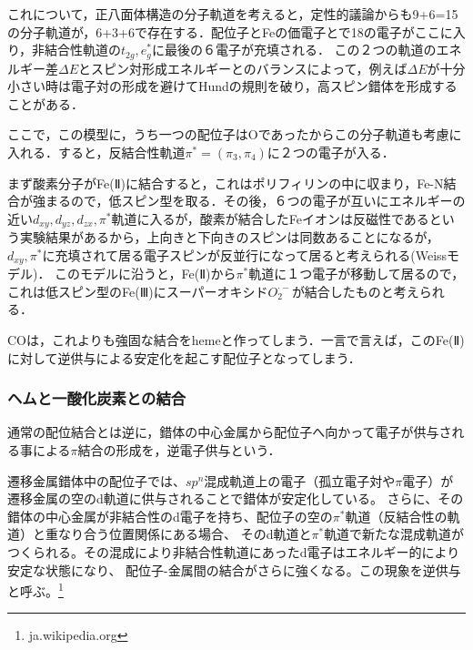 \documentclass[uplatex, dvipdfmx]{jsreport}
\begin{document}
\begin{model}[正八面体構造の分子軌道]
    これについて，正八面体構造の分子軌道を考えると，定性的議論からも9+6=15の分子軌道が，6+3+6で存在する．配位子とFeの価電子とで18の電子がここに入り，非結合性軌道の$t_{2g},e^*_g$に最後の６電子が充填される．
    この２つの軌道のエネルギー差$\Delta E$とスピン対形成エネルギーとのバランスによって，例えば$\Delta E$が十分小さい時は電子対の形成を避けてHundの規則を破り，高スピン錯体を形成することがある．

    ここで，この模型に，うち一つの配位子はOであったからこの分子軌道も考慮に入れる．すると，反結合性軌道$\pi^*=(\pi_3,\pi_4)$に２つの電子が入る．
\end{model}
\begin{explanation}[酸素とヘモグロビンとの結合状態]
    まず酸素分子がFe(Ⅱ)に結合すると，これはポリフィリンの中に収まり，Fe-N結合が強まるので，低スピン型を取る．その後，６つの電子が互いにエネルギーの近い$d_{xy},d_{yz},d_{zx},\pi^*$軌道に入るが，酸素が結合したFeイオンは反磁性であるという実験結果があるから，上向きと下向きのスピンは同数あることになるが，$d_{xy},\pi^*$に充填されて居る電子スピンが反並行になって居ると考えられる(Weissモデル)．
    このモデルに沿うと，Fe(Ⅱ)から$\pi^*$軌道に１つ電子が移動して居るので，これは低スピン型のFe(Ⅲ)にスーパーオキシド$O_2^{\cdot-}$が結合したものと考えられる．
\end{explanation}
COは，これよりも強固な結合をhemeと作ってしまう．一言で言えば，このFe(Ⅱ)に対して逆供与による安定化を起こす配位子となってしまう．

\subsubsection{ヘムと一酸化炭素との結合}

\begin{theory}[COの分子軌道]
    
\end{theory}
\begin{definition}
    通常の配位結合とは逆に，錯体の中心金属から配位子へ向かって電子が供与される事による$\pi$結合の形成を，逆電子供与という．
\end{definition}
\begin{remark}
    遷移金属錯体中の配位子では、$sp^n$混成軌道上の電子（孤立電子対や$\pi$電子）が遷移金属の空のd軌道に供与されることで錯体が安定化している。
    さらに、その錯体の中心金属が非結合性のd電子を持ち、配位子の空の$\pi^*$軌道（反結合性の軌道）と重なり合う位置関係にある場合、
    そのd軌道と$\pi^*$軌道で新たな混成軌道がつくられる。その混成により非結合性軌道にあったd電子はエネルギー的により安定な状態になり、
    配位子-金属間の結合がさらに強くなる。この現象を逆供与と呼ぶ。\footnote{ja.wikipedia.org}
\end{remark}
\end{document}
